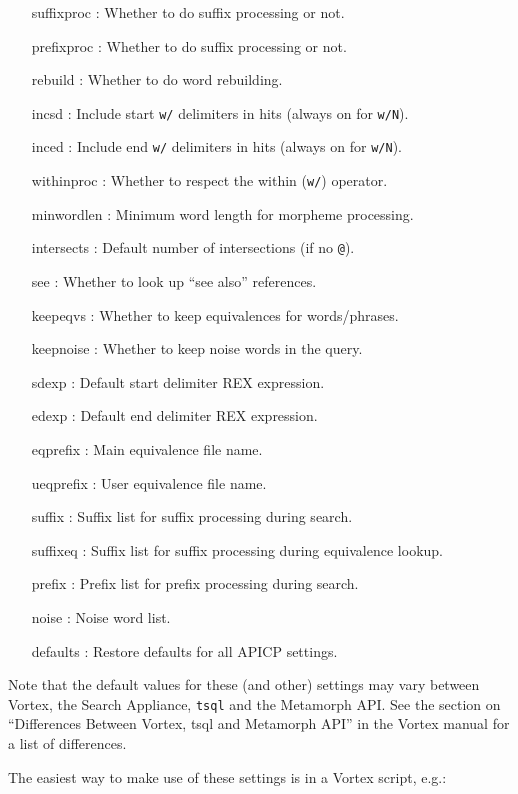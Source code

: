 \begin{itemize}
  \item[suffixproc]: Whether to do suffix processing or not.
  \item[prefixproc]: Whether to do suffix processing or not.
  \item[rebuild]: Whether to do word rebuilding.
  \item[incsd]: Include start \verb`w/` delimiters in hits (always on for \verb`w/N`).
  \item[inced]: Include end \verb`w/` delimiters in hits (always on for \verb`w/N`).
  \item[withinproc]: Whether to respect the within (\verb`w/`) operator.
  \item[minwordlen]: Minimum word length for morpheme processing.
  \item[intersects]: Default number of intersections (if no \verb`@`).
  \item[see]: Whether to look up ``see also'' references.
  \item[keepeqvs]: Whether to keep equivalences for words/phrases.
  \item[keepnoise]: Whether to keep noise words in the query.
  \item[sdexp]: Default start delimiter REX expression.
  \item[edexp]: Default end delimiter REX expression.
  \item[eqprefix]: Main equivalence file name.
  \item[ueqprefix]: User equivalence file name.
  \item[suffix]: Suffix list for suffix processing during search.
  \item[suffixeq]: Suffix list for suffix processing during equivalence lookup.
  \item[prefix]: Prefix list for prefix processing during search.
  \item[noise]: Noise word list.
  \item[defaults]: Restore defaults for all APICP settings.
\end{itemize}

  Note that the default values for these (and other) settings may vary
between Vortex, the Search Appliance, \verb`tsql` and the Metamorph
API.  See the section on ``Differences Between Vortex, tsql and
Metamorph API'' in the Vortex manual for a list of differences.

  The easiest way to make use of these settings is in a Vortex script, e.g.:

